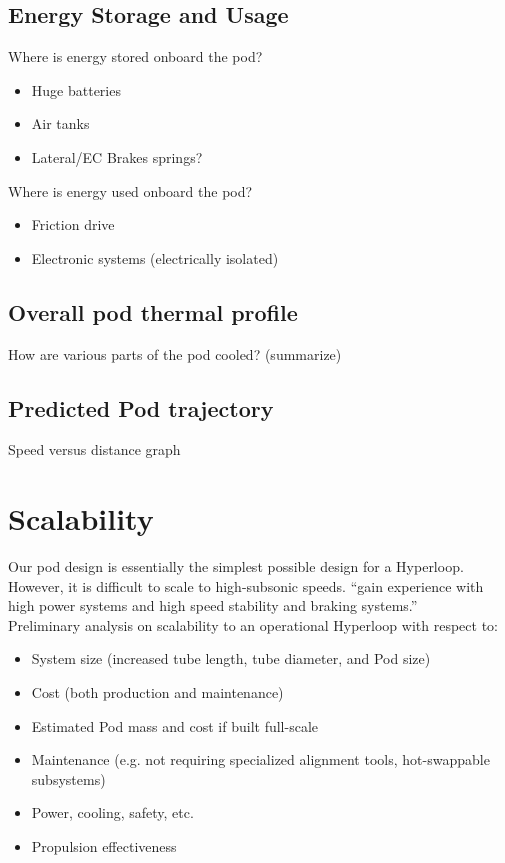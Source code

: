 \documentclass{report}
\begin{document}
    \subsection{Energy Storage and Usage}
    Where is energy stored onboard the pod?
    \begin{itemize}
        \item Huge batteries
        \item Air tanks
        \item Lateral/EC Brakes springs?
    \end{itemize}
    Where is energy used onboard the pod?
    \begin{itemize}
        \item Friction drive
        \item Electronic systems (electrically isolated)
    \end{itemize}
    
    \subsection{Overall pod thermal profile}
    How are various parts of the pod cooled? (summarize)
    
    \subsection{Predicted Pod trajectory}
    Speed versus distance graph
    
    \section{Scalability}
    Our pod design is essentially the simplest possible design for a Hyperloop. However, it is difficult to scale to high-subsonic speeds.
    “gain experience with high power systems and high speed stability and braking systems.”\\
    
    Preliminary analysis on scalability to an operational Hyperloop with respect to:
    \begin{itemize}
        \item System size (increased tube length, tube diameter, and Pod size)
        \item Cost (both production and maintenance)
        \item Estimated Pod mass and cost if built full-scale
        \item Maintenance (e.g. not requiring specialized alignment tools, hot-swappable subsystems)
        \item Power, cooling, safety, etc.
        \item Propulsion effectiveness
    \end{itemize}
    
\end{document}
